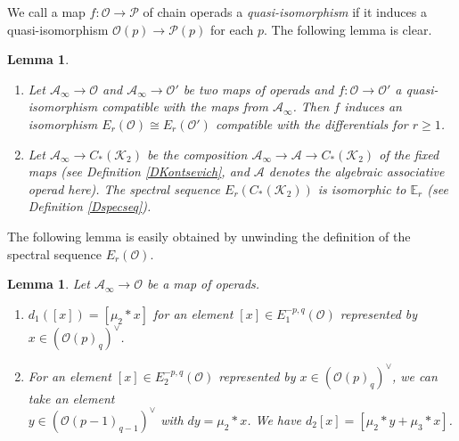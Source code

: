 \documentclass[reqno]{amsart}
\theoremstyle{definition}
\theoremstyle{plain}
\newtheorem{lem}[defi]{Lemma}
\newcommand{\oper}{\mathcal{O}}%
\newcommand{\ASS}{\mathcal{A}}%
\newcommand{\KK}{\mathcal{K}}%
\newcommand{\aoper}{\mathcal{P}}%
\newcommand{\EE}{\mathbb{E}}
\begin{document}
We call a map $f:\oper\to \aoper$ of chain operads  a {\em quasi-isomorphism} if it induces a quasi-isomorphism $\oper(p)\to \aoper(p)$ for each $p$. 
The following lemma is clear.
\begin{lem}\label{Lspec_natural}
\begin{enumerate}
\item Let $\ASS_\infty\to \oper$ and $\ASS_\infty\to \oper'$ be two maps of operads and $f:\oper\to \oper'$ a quasi-isomorphism compatible with the maps from $\ASS_\infty$. Then $f$ induces an isomorphism $E_r(\oper)\cong E_r(\oper')$ compatible with the differentials for $r\geq 1$.
\item Let $\ASS_\infty\to C_*(\KK_2)$ be the composition $\ASS_\infty\to \ASS\to C_*(\KK_2)$ of the fixed maps (see Definition \ref{DKontsevich}, and $\ASS$ denotes the algebraic associative operad here). The spectral sequence $E_r(C_*(\KK_2))$ is isomorphic to $\EE_r$ (see Definition \ref{Dspecseq}). \hfill\qedsymbol
\end{enumerate}
\end{lem}
The following lemma is easily obtained by unwinding the definition of the spectral sequence $E_r(\oper)$.
\begin{lem}\label{Lspec_diff_description}
Let $\ASS_\infty\to \oper$ be a map of operads. 
\begin{enumerate}
\item $d_1([x])=[\mu_2*x]$ for an element $[x]\in E^{-p,q}_1(\oper)$ represented by $x\in (\oper(p)_q)^\vee$.
\item For an element $[x]\in E^{-p,q}_2(\oper)$ represented by $x\in (\oper(p)_q)^\vee$, we  can take an element \\$y\in (\oper(p-1)_{q-1})^\vee$ with $dy=\mu_2*x$. We have $d_2[x]=[\mu_2*y+\mu_3*x]$.\hfill \qedsymbol
\end{enumerate}
\end{lem}
\end{document}
